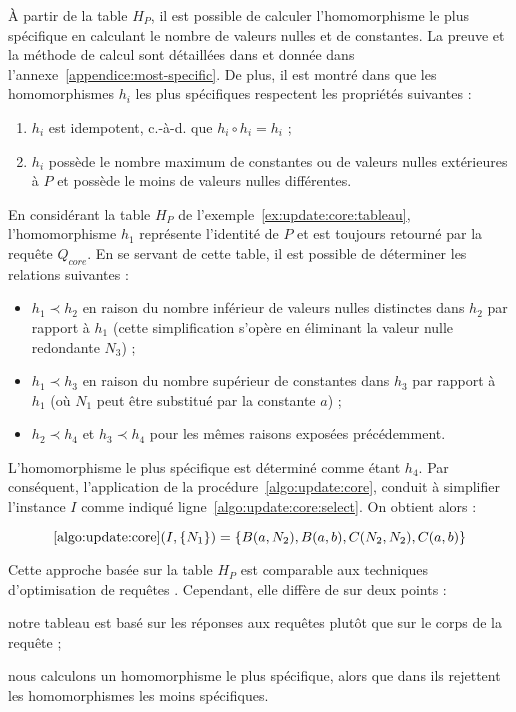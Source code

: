 À partir de la table $H_P$, il est possible de calculer l'homomorphisme le plus spécifique en calculant le nombre de valeurs nulles et de constantes.
La preuve et la méthode de calcul sont détaillées dans \cite{chabinIncrementalConsistentUpdating2023} et donnée dans l'annexe~\ref{appendice:most-specific}.
De plus, il est montré dans \cite{chabinIncrementalConsistentUpdating2023} que les homomorphismes $h_i$ les plus spécifiques respectent les propriétés suivantes :

\begin{enumerate}
	\item $h_i$ est idempotent, c.-à-d. que $h_i \circ h_i = h_i$ ;
	\item $h_i$ possède le nombre maximum de constantes ou de valeurs nulles extérieures à $P$ et possède le moins de valeurs nulles différentes.
\end{enumerate}

\begin{example}
	En considérant la table $H_P$ de l'exemple~\ref{ex:update:core:tableau}, l'homomorphisme $h_1$ représente l'identité de $P$ et est toujours retourné par la requête $Q_{core}$.
	En se servant de cette table, il est possible de déterminer les relations suivantes :

	\begin{itemize}
		\item $h_1 \prec h_2$ en raison du nombre inférieur de valeurs nulles distinctes dans $h_2$ par rapport à $h_1$ (cette simplification s'opère en éliminant la valeur nulle redondante $N_3$) ;
		\item $h_1 \prec h_3$ en raison du nombre supérieur de constantes dans $h_3$ par rapport à $h_1$ (où $N_1$ peut être substitué par la constante $a$) ;
		\item $h_2 \prec h_4$ et $h_3 \prec h_4$ pour les mêmes raisons exposées précédemment.
	\end{itemize}

	L'homomorphisme le plus spécifique est déterminé comme étant $h_4$.
	Par conséquent, l'application de la procédure~\ref{algo:update:core}, conduit à simplifier l'instance $I$ comme indiqué ligne~\ref{algo:update:core:select}. On obtient alors :

	\[
		\ref{algo:update:core}(I, \{N_1\}) = \{B(a, N_2), B(a, b), C(N_2, N_2), C(a, b)\}
	\]
\end{example}

Cette approche basée sur la table $H_P $ est comparable aux techniques d'optimisation de requêtes \cite{chandraOptimalImplementationConjunctive1977}.
Cependant, elle diffère de \cite{ahoEfficientOptimizationClass1979,chandraOptimalImplementationConjunctive1977} sur deux points :
\begin{enumerate*}[label=(\roman*)]
	\item notre tableau est basé sur les réponses aux requêtes plutôt que sur le corps de la requête ;
	\item nous calculons un homomorphisme le plus spécifique, alors que dans \cite{ahoEfficientOptimizationClass1979} ils rejettent les homomorphismes les moins spécifiques.
\end{enumerate*}
